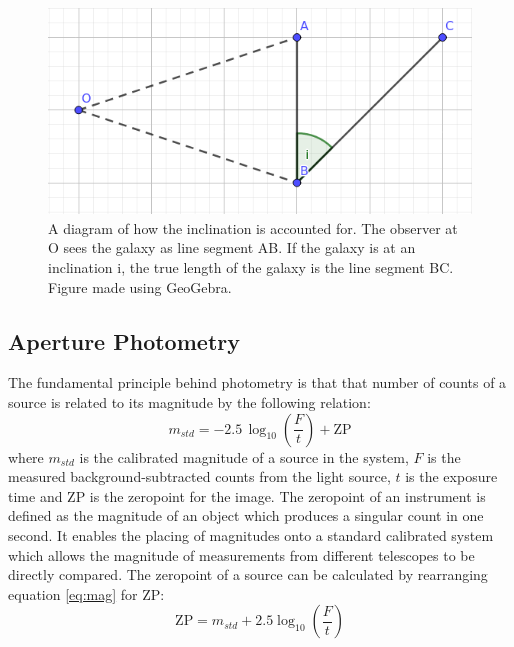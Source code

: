 \documentclass[%
reprint,
amsmath,amssymb,
aps,
]{revtex4-2}
\begin{document}
				\begin{figure}
					\includegraphics[width=0.75\columnwidth]{inclinationAdjustment.png}
					\caption{\label{fig:inclination} A diagram of how the inclination is accounted for. The observer at O sees the galaxy as line segment AB. If the galaxy is at an inclination i, the true length of the galaxy is the line segment BC. Figure made using GeoGebra.}
				\end{figure}
		
		\subsection{Aperture Photometry}
			
			The fundamental principle behind photometry is that that number of counts of a source is related to its magnitude by the following relation\cite{manual}:
			\begin{equation}
				m_{std} = -2.5 \, \log_{10}\left(\frac{F}{t}\right) + \text{ZP}
				\label{eq:mag}
			\end{equation} where $m_{std}$ is the calibrated magnitude of a source in the system, $F$ is the measured background-subtracted counts from the light source, $t$ is the exposure time and $\text{ZP}$ is the zeropoint for the image. The zeropoint of an instrument is defined as the magnitude of an object which produces a singular count in one second\cite{hst}. It enables the placing of magnitudes onto a standard calibrated system which allows the magnitude of measurements from different telescopes to be directly compared\cite{manual}. The zeropoint of a source can be calculated by rearranging equation \ref{eq:mag} for $\text{ZP}$:			
			\begin{equation}
				\text{ZP} = m_{std} + 2.5 \log_{10}\left(\frac{F}{t}\right)
				\label{eq:zeropoint}
			\end{equation} 
			
\end{document}
